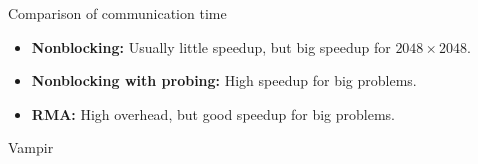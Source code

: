 \documentclass[9pt,pdftex]{beamer}
\begin{document}
\begin{frame}{Comparison of communication time}
{\begin{figure}
\end{figure}
}
\begin{itemize}
\item \textbf{Nonblocking:} Usually little speedup, but big speedup for $2048\times2048$.
\item \textbf{Nonblocking with probing:} High speedup for big problems.
\item \textbf{RMA:} High overhead, but good speedup for big problems.
\end{itemize}

\end{frame}

\begin{frame}{Vampir}
\end{frame}
\end{document}
